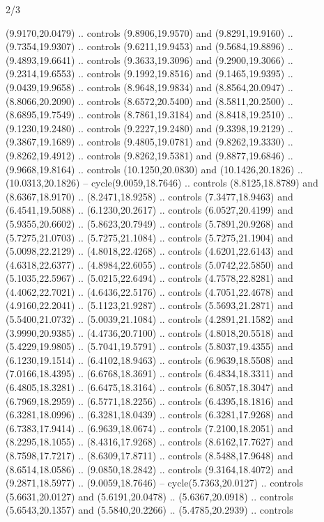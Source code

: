 \begin{flagdescription}{2/3}
\begin{scope}[yshift=\flagwidth,scale=\flagwidth/1241.93737]
\begin{scope}[y=-1mm, x=1mm,draw=gold,fill=blue,line join=miter,miter limit=4,line width=1.8\lw]
{  (9.9170,20.0479) .. controls (9.8906,19.9570) and (9.8291,19.9160) ..
  (9.7354,19.9307) .. controls (9.6211,19.9453) and (9.5684,19.8896) ..
  (9.4893,19.6641) .. controls (9.3633,19.3096) and (9.2900,19.3066) ..
  (9.2314,19.6553) .. controls (9.1992,19.8516) and (9.1465,19.9395) ..
  (9.0439,19.9658) .. controls (8.9648,19.9834) and (8.8564,20.0947) ..
  (8.8066,20.2090) .. controls (8.6572,20.5400) and (8.5811,20.2500) ..
  (8.6895,19.7549) .. controls (8.7861,19.3184) and (8.8418,19.2510) ..
  (9.1230,19.2480) .. controls (9.2227,19.2480) and (9.3398,19.2129) ..
  (9.3867,19.1689) .. controls (9.4805,19.0781) and (9.8262,19.3330) ..
  (9.8262,19.4912) .. controls (9.8262,19.5381) and (9.8877,19.6846) ..
  (9.9668,19.8164) .. controls (10.1250,20.0830) and (10.1426,20.1826) ..
  (10.0313,20.1826) -- cycle(9.0059,18.7646) .. controls (8.8125,18.8789) and
  (8.6367,18.9170) .. (8.2471,18.9258) .. controls (7.3477,18.9463) and
  (6.4541,19.5088) .. (6.1230,20.2617) .. controls (6.0527,20.4199) and
  (5.9355,20.6602) .. (5.8623,20.7949) .. controls (5.7891,20.9268) and
  (5.7275,21.0703) .. (5.7275,21.1084) .. controls (5.7275,21.1904) and
  (5.0098,22.2129) .. (4.8018,22.4268) .. controls (4.6201,22.6143) and
  (4.6318,22.6377) .. (4.8984,22.6055) .. controls (5.0742,22.5850) and
  (5.1035,22.5967) .. (5.0215,22.6494) .. controls (4.7578,22.8281) and
  (4.4062,22.7021) .. (4.6436,22.5176) .. controls (4.7051,22.4678) and
  (4.9160,22.2041) .. (5.1123,21.9287) .. controls (5.5693,21.2871) and
  (5.5400,21.0732) .. (5.0039,21.1084) .. controls (4.2891,21.1582) and
  (3.9990,20.9385) .. (4.4736,20.7100) .. controls (4.8018,20.5518) and
  (5.4229,19.9805) .. (5.7041,19.5791) .. controls (5.8037,19.4355) and
  (6.1230,19.1514) .. (6.4102,18.9463) .. controls (6.9639,18.5508) and
  (7.0166,18.4395) .. (6.6768,18.3691) .. controls (6.4834,18.3311) and
  (6.4805,18.3281) .. (6.6475,18.3164) .. controls (6.8057,18.3047) and
  (6.7969,18.2959) .. (6.5771,18.2256) .. controls (6.4395,18.1816) and
  (6.3281,18.0996) .. (6.3281,18.0439) .. controls (6.3281,17.9268) and
  (6.7383,17.9414) .. (6.9639,18.0674) .. controls (7.2100,18.2051) and
  (8.2295,18.1055) .. (8.4316,17.9268) .. controls (8.6162,17.7627) and
  (8.7598,17.7217) .. (8.6309,17.8711) .. controls (8.5488,17.9648) and
  (8.6514,18.0586) .. (9.0850,18.2842) .. controls (9.3164,18.4072) and
  (9.2871,18.5977) .. (9.0059,18.7646) -- cycle(5.7363,20.0127) .. controls
  (5.6631,20.0127) and (5.6191,20.0478) .. (5.6367,20.0918) .. controls
  (5.6543,20.1357) and (5.5840,20.2266) .. (5.4785,20.2939) .. controls
}
\end{scope}
\end{scope}
\end{flagdescription}
